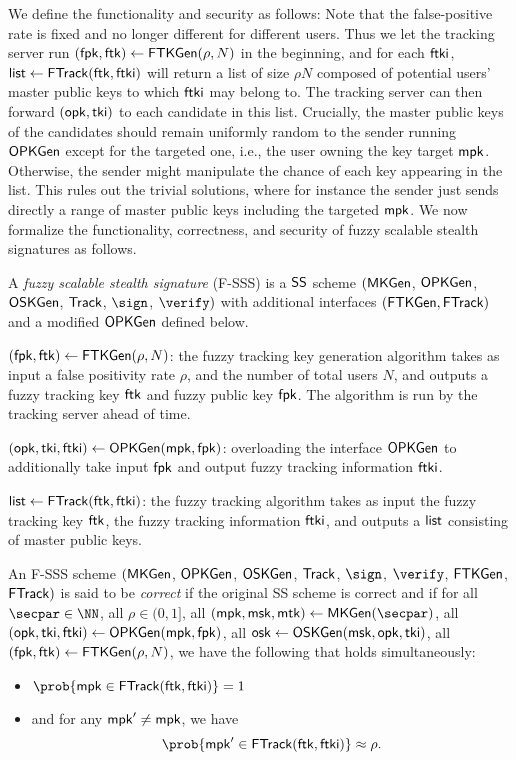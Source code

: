 We define the functionality and security as follows: Note that the false-positive rate is fixed and no longer different for different users. Thus we let the tracking server run $(\mathsf{fpk},\mathsf{ftk})\gets\mathsf{FTKGen}(\rho, N)$ in the beginning, and for each $\mathsf{ftki}$, $\mathsf{list}\gets\mathsf{FTrack}(\mathsf{ftk},\allowbreak\mathsf{ftki})$ will return a list of size $\rho N$ composed of potential users' master public keys to which $\mathsf{ftki}$ may belong to. The tracking server can then forward $(\mathsf{opk},\mathsf{tki})$ to each candidate in this list. Crucially, the master public keys of the candidates should remain uniformly random to the sender running $\mathsf{OPKGen}$ except for the targeted one, i.e., the user owning the key target $\mathsf{mpk}$. Otherwise, the sender might manipulate the chance of each key appearing in the list. This rules out the trivial solutions, where for instance the sender just sends directly a range of master public keys including the targeted $\mathsf{mpk}$.
\fi
We now formalize the functionality, correctness, and security of fuzzy scalable stealth signatures as follows.
\begin{definition}
A \emph{fuzzy scalable stealth signature} (F-SSS) is a $\mathsf{SS}$ scheme  $(\mathsf{MKGen}$, $\mathsf{OPKGen}$, $\mathsf{OSKGen}$, $\mathsf{Track}$, $\sign$, $\verify)$ with additional interfaces $(\mathsf{FTKGen}, \mathsf{FTrack})$ and a modified $\mathsf{OPKGen}$ defined below.

\smallskip\noindent\underline{$(\mathsf{fpk},\mathsf{ftk})\gets \mathsf{FTKGen}(\rho, N)$}: the fuzzy tracking key generation algorithm takes as input a false positivity rate $\rho$, and the number of total users $N$, and outputs a fuzzy tracking key $\mathsf{ftk}$ and fuzzy public key $\mathsf{fpk}$. The algorithm is run by the tracking server ahead of time.

\smallskip\noindent\underline{$(\mathsf{opk},\mathsf{tki},\mathsf{ftki}) \gets \mathsf{OPKGen}(\mathsf{mpk},\mathsf{fpk})$}: overloading the interface $\mathsf{OPKGen}$ to additionally take input $\mathsf{fpk}$ and output fuzzy tracking information $\mathsf{ftki}$.


\smallskip\noindent\underline{$\mathsf{list} \gets \mathsf{FTrack}(\mathsf{ftk}, \mathsf{ftki})$}: the fuzzy tracking algorithm takes as input the fuzzy tracking key $\mathsf{ftk}$, the fuzzy tracking information $\mathsf{ftki}$, and outputs a $\mathsf{list}$ consisting of master public keys. 
\end{definition}

\begin{definition}\label{def:fuzzy*-tracking-correct}
An F-SSS scheme $(\mathsf{MKGen}$, $\mathsf{OPKGen}$, $\mathsf{OSKGen}$, $\mathsf{Track}$, $\sign$, $\verify$, $\mathsf{FTKGen}$, $\mathsf{FTrack})$ is said to be \emph{correct} if the original SS scheme is correct and if for all $\secpar \in \NN$, all $\rho \in (0,1]$, all $(\mpk, \msk, \mtk) \gets \mkgen(\secpar)$, all $(\mathsf{opk}, \mathsf{tki}, \mathsf{ftki}) \gets \mathsf{OPKGen}(\mathsf{mpk},\mathsf{fpk})$, all $\mathsf{osk} \gets \mathsf{OSKGen}(\mathsf{msk}, \mathsf{opk}, \allowbreak \mathsf{tki})$, all $(\mathsf{fpk},\mathsf{ftk}) \gets \mathsf{FTKGen}(\rho, N)$, we have the following that holds simultaneously:
\begin{itemize}[leftmargin=*]
    \item $\prob{\mpk\in\ftrack(\ftk, \ftki)} = 1$ 
    \item and for any $\mathsf{mpk}' \ne \mathsf{mpk}$, we have $$\prob{\mpk'\in\ftrack(\ftk, \ftki)} \approx \rho.$$
\end{itemize}
\end{definition}

